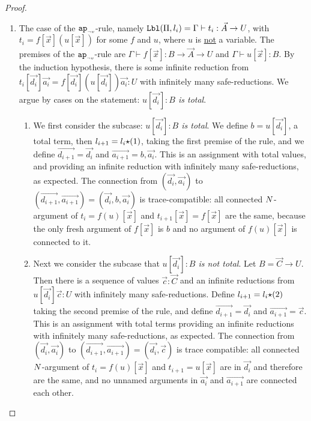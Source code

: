 \begin{proof}
\begin{enumerate}
\item
  The case of the ${{\tt ap}_{\mbox{\tiny $\neg v$}}}$-rule, namely 
  ${\tt Lbl}(\Pi,l_i) = \Gamma\vdash t_i: \vec{A}\rightarrow U$, 
  with $t_i = f[\vec{x}](u[\vec{x}])$ for some $f$ and $u$, 
  where $u$ is \underline{not} a variable.
  The premises of the ${{\tt ap}_{\mbox{\tiny $\neg v$}}}$-rule
   are $\Gamma\vdash f[\vec{x}]: B \rightarrow \vec{A}\rightarrow U$ 
  and $\Gamma\vdash u[\vec{x}]: B$.
  By the induction hypothesis, there is some infinite reduction from
  $t_i[\vec{d_i}]\vec{a_i} = f[\vec{d_i}](u[\vec{d_i}])\vec{a_i}:U$ 
  with infinitely many safe-reductions.
  We argue by cases on the statement: \emph{$u[\vec{d_i}]:B$ is total}.
\begin{enumerate}
\item
  We first consider the subcase: \emph{$u[\vec{d_i}]:B$ is total}.
  We define $b = u[\vec{d_i}]$, a total term, 
  then $l_{i+1}=l_i {\star} (1)$, taking the first premise of the rule,
  and we define $\vec{d_{i+1}} = \vec{d_i}$ and $\vec{a_{i+1}} = b,\vec{a_i}$. 
  This is an assignment with total values, 
  and providing an infinite reduction with infinitely many safe-reductions, as expected. 
  The connection from 
  $(\vec{d_i},\vec{a_i})$ to $(\vec{d_{i+1}},\vec{a_{i+1}}) = (\vec{d_i},b,\vec{a_i})$ 
  is trace-compatible: all connected 
  ${N}$-argument of $t_{i}=f(u)[\vec{x}]$ and $t_{i+1}[\vec{x}] = f[\vec{x}]$ are the same,
  because the only fresh argument of $f[\vec{x}]$ 
  is $b$ and no argument of $f(u)[\vec{x}]$ is connected to it.
\item
  Next we consider the subcase that \emph{$u[\vec{d_i}]:B$ is not total}.
  Let $B = \vec{C}\rightarrow U$.
  Then there is a sequence of values $\vec{c}:\vec{C}$ and an infinite reductions from 
  $u[\vec{d_i}]\vec{c}: U$ with infinitely many safe-reductions.
  Define $l_{i+1}= l_i {\star} (2)$ taking the second premise of the rule,
  and define $\vec{d_{i+1}} = \vec{d_i}$ and $\vec{a_{i+1}} = \vec{c}$. 
  This is an assignment with total terms providing an infinite reductions with 
  infinitely many safe-reductions, as expected.
  The connection from 
  $(\vec{d_i},\vec{a_i})$ to $(\vec{d_{i+1}},\vec{a_{i+1}}) = (\vec{d_i},\vec{c})$ is
  trace compatible: all connected ${N}$-argument of $t_{i} = f(u)[\vec{x}]$ and $t_{i+1}=u[\vec{x}]$ are 
  in $\vec{d_i}$ and therefore are the same, and no unnamed arguments in $\vec{a_i}$
  and $\vec{a_{i+1}}$ are connected each other.
 \end{enumerate}


\end{enumerate}
\end{proof}
